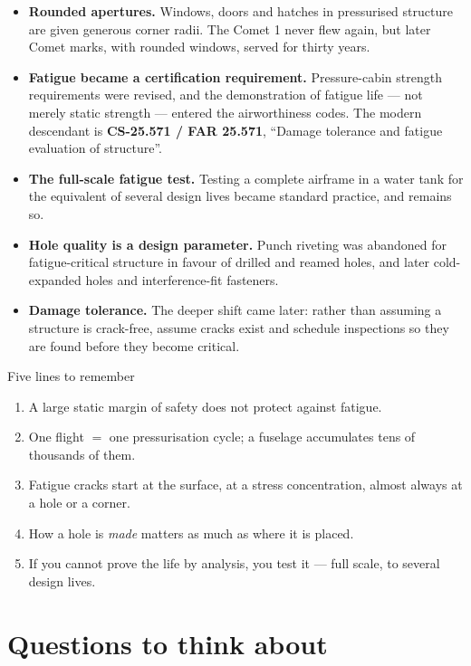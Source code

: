 \documentclass[11pt,a4paper]{article}
\begin{document}
\begin{itemize}[nosep]
  \item \textbf{Rounded apertures.} Windows, doors and hatches in pressurised structure are given generous corner radii. The Comet 1 never flew again, but later Comet marks, with rounded windows, served for thirty years.
  \item \textbf{Fatigue became a certification requirement.} Pressure-cabin strength requirements were revised, and the demonstration of fatigue life --- not merely static strength --- entered the airworthiness codes. The modern descendant is \textbf{CS-25.571 / FAR 25.571}, ``Damage tolerance and fatigue evaluation of structure''.
  \item \textbf{The full-scale fatigue test.} Testing a complete airframe in a water tank for the equivalent of several design lives became standard practice, and remains so.
  \item \textbf{Hole quality is a design parameter.} Punch riveting was abandoned for fatigue-critical structure in favour of drilled and reamed holes, and later cold-expanded holes and interference-fit fasteners.
  \item \textbf{Damage tolerance.} The deeper shift came later: rather than assuming a structure is crack-free, assume cracks exist and schedule inspections so they are found before they become critical.
\end{itemize}

\begin{sumbox}{Five lines to remember}
\begin{enumerate}[nosep]
  \item A large static margin of safety does not protect against fatigue.
  \item One flight $=$ one pressurisation cycle; a fuselage accumulates tens of thousands of them.
  \item Fatigue cracks start at the surface, at a stress concentration, almost always at a hole or a corner.
  \item How a hole is \emph{made} matters as much as where it is placed.
  \item If you cannot prove the life by analysis, you test it --- full scale, to several design lives.
\end{enumerate}
\end{sumbox}

\section{Questions to think about}
\end{document}
